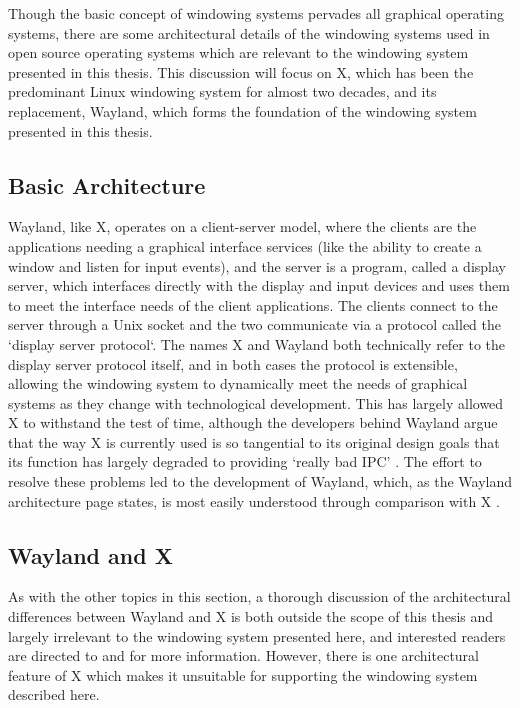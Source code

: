 Though the basic concept of windowing systems pervades all graphical operating systems, there are some architectural details of the windowing systems used in open source operating systems which are relevant to the windowing system presented in this thesis. This discussion will focus on X, which has been the predominant Linux windowing system for almost two decades, and its replacement, Wayland, which forms the foundation of the windowing system presented in this thesis.

\subsection{Basic Architecture}

Wayland, like X, operates on a client-server model, where the clients are the applications needing a graphical interface services (like the ability to create a window and listen for input events), and the server is a program, called a display server, which interfaces directly with the display and input devices and uses them to meet the interface needs of the client applications. The clients   connect to the server through a Unix socket and the two communicate via a protocol called the `display server protocol`. The names X and Wayland both technically refer to the display server protocol itself, and in both cases the protocol is extensible, allowing the windowing system to dynamically meet the needs of graphical systems as they change with technological development. This has largely allowed X to withstand the test of time, although the developers behind Wayland argue that the way X is currently used is so tangential to its original design goals that its function has largely degraded to providing `really bad IPC' \cite{real-story-wayland}. The effort to resolve these problems led to the development of Wayland, which, as the Wayland architecture page states, is most easily understood through comparison with X \cite{wayland}.

\subsection{Wayland and X}
\label{sec:wayland-and-x}

As with the other topics in this section, a thorough discussion of the architectural differences between Wayland and X is both outside the scope of this thesis and largely irrelevant to the windowing system presented here, and interested readers are directed to \cite{wayland} and \cite{real-story-wayland} for more information. However, there is one architectural feature of X which makes it unsuitable for supporting the windowing system described here.

